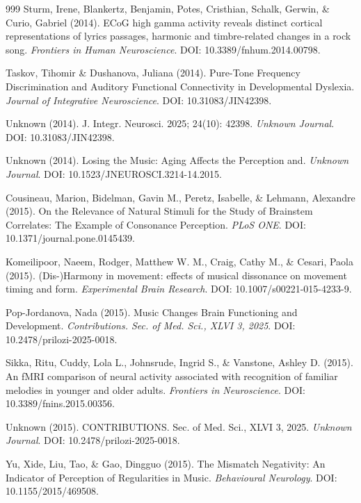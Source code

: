 \documentclass[9pt,onecolumn]{article}
\begin{document}
\begin{thebibliography}{999}
Sturm, Irene, Blankertz, Benjamin, Potes, Cristhian, Schalk, Gerwin, \& Curio, Gabriel (2014). ECoG high gamma activity reveals distinct cortical representations of lyrics passages, harmonic and timbre-related changes in a rock song. \textit{Frontiers in Human Neuroscience}. DOI: 10.3389/fnhum.2014.00798.

Taskov, Tihomir \& Dushanova, Juliana (2014). Pure-Tone Frequency Discrimination and Auditory Functional Connectivity in Developmental Dyslexia. \textit{Journal of Integrative Neuroscience}. DOI: 10.31083/JIN42398.

Unknown (2014). J. Integr. Neurosci. 2025; 24(10): 42398. \textit{Unknown Journal}. DOI: 10.31083/JIN42398.

Unknown (2014). Losing the Music: Aging Affects the Perception and. \textit{Unknown Journal}. DOI: 10.1523/JNEUROSCI.3214-14.2015.

Cousineau, Marion, Bidelman, Gavin M., Peretz, Isabelle, \& Lehmann, Alexandre (2015). On the Relevance of Natural Stimuli for the Study of Brainstem Correlates: The Example of Consonance Perception. \textit{PLoS ONE}. DOI: 10.1371/journal.pone.0145439.

Komeilipoor, Naeem, Rodger, Matthew W. M., Craig, Cathy M., \& Cesari, Paola (2015). (Dis-)Harmony in movement: effects of musical dissonance on movement timing and form. \textit{Experimental Brain Research}. DOI: 10.1007/s00221-015-4233-9.

Pop-Jordanova, Nada (2015). Music Changes Brain Functioning and Development. \textit{Contributions. Sec. of Med. Sci., XLVI 3, 2025}. DOI: 10.2478/prilozi-2025-0018.

Sikka, Ritu, Cuddy, Lola L., Johnsrude, Ingrid S., \& Vanstone, Ashley D. (2015). An fMRI comparison of neural activity associated with recognition of familiar melodies in younger and older adults. \textit{Frontiers in Neuroscience}. DOI: 10.3389/fnins.2015.00356.

Unknown (2015). CONTRIBUTIONS. Sec. of Med. Sci., XLVI 3, 2025. \textit{Unknown Journal}. DOI: 10.2478/prilozi-2025-0018.

Yu, Xide, Liu, Tao, \& Gao, Dingguo (2015). The Mismatch Negativity: An Indicator of Perception of Regularities in Music. \textit{Behavioural Neurology}. DOI: 10.1155/2015/469508.


\end{thebibliography}
\end{document}
